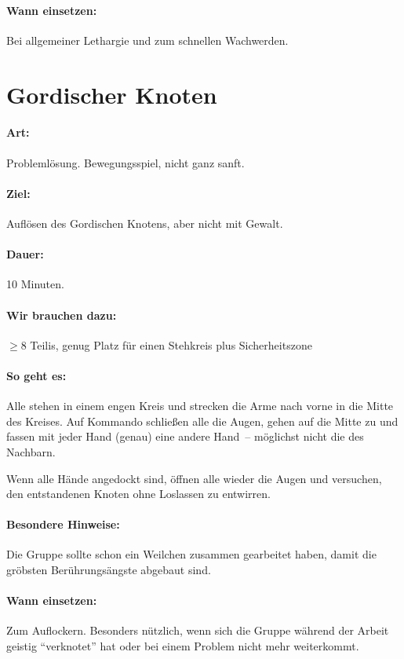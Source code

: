 \paragraph{Wann einsetzen:} Bei allgemeiner Lethargie und zum schnellen Wachwerden.

\section{Gordischer Knoten}
\paragraph{Art:} Problemlösung. Bewegungsspiel, nicht ganz sanft.
\paragraph{Ziel:} Auflösen des Gordischen Knotens, aber nicht mit Gewalt.
\paragraph{Dauer:} 10 Minuten.
\paragraph{Wir brauchen dazu:} $\geq 8$ Teilis, genug Platz für einen Stehkreis plus Sicherheitszone
\paragraph{So geht es:} Alle stehen in einem engen Kreis und strecken die Arme nach vorne in die Mitte des Kreises. Auf Kommando schließen alle die Augen, gehen auf die Mitte zu und fassen mit jeder Hand (genau) eine andere Hand~-- möglichst nicht die des Nachbarn.

Wenn alle Hände angedockt sind, öffnen alle wieder die Augen und versuchen, den entstandenen Knoten ohne Loslassen zu entwirren.
\paragraph{Besondere Hinweise:} Die Gruppe sollte schon ein Weilchen zusammen gearbeitet haben, damit die gröbsten Berührungsängste abgebaut sind.
\paragraph{Wann einsetzen:} Zum Auflockern. Besonders nützlich, wenn sich die Gruppe während der Arbeit geistig "`verknotet"' hat oder bei einem Problem nicht mehr weiterkommt.

